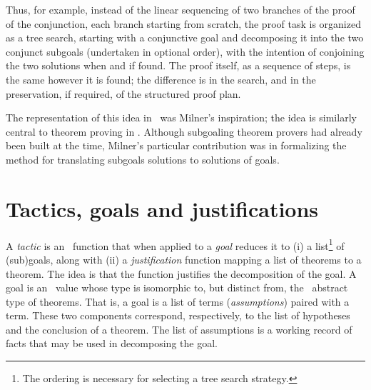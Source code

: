 Thus, for example, instead of
the linear sequencing of two branches of the proof of the conjunction,
each branch starting from scratch, the proof task is organized
as a tree search, starting with a conjunctive goal
and decomposing it into the two conjunct subgoals (undertaken in optional
order), with the intention of conjoining the two solutions when and if found.
The proof itself, as a sequence of steps, is the same however it is found;
the difference is in the search, and in the preservation, if required, of
the structured proof plan.

The representation of this idea in \LCF\ was Milner's inspiration;
the idea is similarly central to theorem proving in \HOL.
Although subgoaling theorem provers had already been built at the time,
Milner's particular contribution was in formalizing the method for
translating subgoals solutions to solutions of goals.




\section{Tactics, goals and justifications}
\label{tactics}

A {\it tactic\/} is an \ML\ function that when applied to a {\it goal\/}
reduces it to (i) a list\footnote{The ordering is necessary for selecting
a tree search strategy.} of
(sub)goals, along with (ii) a {\it justification\/}
 function mapping
a list of theorems to a theorem.
The idea is that the function justifies the decomposition of the goal.
A goal is an \ML\ value whose type is isomorphic
to, but distinct from, the \ML\ abstract type  of theorems.
That is, a goal is
a list of terms ({\it assumptions\/})
 paired with a term.
These two components correspond, respectively, to the list of hypotheses
and the conclusion of a theorem. The list of assumptions is a working
record of facts that may be used in decomposing the goal.

